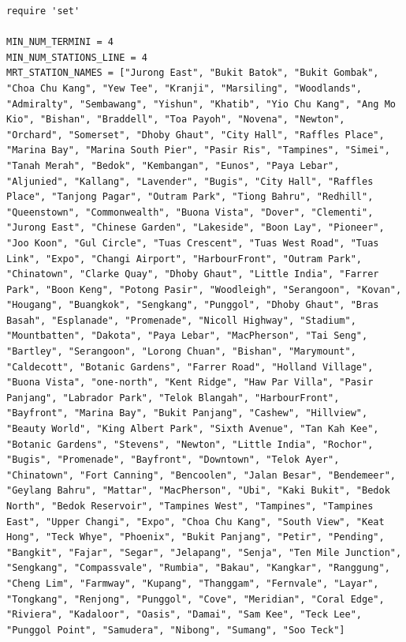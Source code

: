 \documentclass[a4paper,12pt]{article}
\begin{document}
	\begin{verbatim}
require 'set'

MIN_NUM_TERMINI = 4
MIN_NUM_STATIONS_LINE = 4
MRT_STATION_NAMES = ["Jurong East", "Bukit Batok", "Bukit Gombak", "Choa Chu Kang", "Yew Tee", "Kranji", "Marsiling", "Woodlands", "Admiralty", "Sembawang", "Yishun", "Khatib", "Yio Chu Kang", "Ang Mo Kio", "Bishan", "Braddell", "Toa Payoh", "Novena", "Newton", "Orchard", "Somerset", "Dhoby Ghaut", "City Hall", "Raffles Place", "Marina Bay", "Marina South Pier", "Pasir Ris", "Tampines", "Simei", "Tanah Merah", "Bedok", "Kembangan", "Eunos", "Paya Lebar", "Aljunied", "Kallang", "Lavender", "Bugis", "City Hall", "Raffles Place", "Tanjong Pagar", "Outram Park", "Tiong Bahru", "Redhill", "Queenstown", "Commonwealth", "Buona Vista", "Dover", "Clementi", "Jurong East", "Chinese Garden", "Lakeside", "Boon Lay", "Pioneer", "Joo Koon", "Gul Circle", "Tuas Crescent", "Tuas West Road", "Tuas Link", "Expo", "Changi Airport", "HarbourFront", "Outram Park", "Chinatown", "Clarke Quay", "Dhoby Ghaut", "Little India", "Farrer Park", "Boon Keng", "Potong Pasir", "Woodleigh", "Serangoon", "Kovan", "Hougang", "Buangkok", "Sengkang", "Punggol", "Dhoby Ghaut", "Bras Basah", "Esplanade", "Promenade", "Nicoll Highway", "Stadium", "Mountbatten", "Dakota", "Paya Lebar", "MacPherson", "Tai Seng", "Bartley", "Serangoon", "Lorong Chuan", "Bishan", "Marymount", "Caldecott", "Botanic Gardens", "Farrer Road", "Holland Village", "Buona Vista", "one-north", "Kent Ridge", "Haw Par Villa", "Pasir Panjang", "Labrador Park", "Telok Blangah", "HarbourFront", "Bayfront", "Marina Bay", "Bukit Panjang", "Cashew", "Hillview", "Beauty World", "King Albert Park", "Sixth Avenue", "Tan Kah Kee", "Botanic Gardens", "Stevens", "Newton", "Little India", "Rochor", "Bugis", "Promenade", "Bayfront", "Downtown", "Telok Ayer", "Chinatown", "Fort Canning", "Bencoolen", "Jalan Besar", "Bendemeer", "Geylang Bahru", "Mattar", "MacPherson", "Ubi", "Kaki Bukit", "Bedok North", "Bedok Reservoir", "Tampines West", "Tampines", "Tampines East", "Upper Changi", "Expo", "Choa Chu Kang", "South View", "Keat Hong", "Teck Whye", "Phoenix", "Bukit Panjang", "Petir", "Pending", "Bangkit", "Fajar", "Segar", "Jelapang", "Senja", "Ten Mile Junction", "Sengkang", "Compassvale", "Rumbia", "Bakau", "Kangkar", "Ranggung", "Cheng Lim", "Farmway", "Kupang", "Thanggam", "Fernvale", "Layar", "Tongkang", "Renjong", "Punggol", "Cove", "Meridian", "Coral Edge", "Riviera", "Kadaloor", "Oasis", "Damai", "Sam Kee", "Teck Lee", "Punggol Point", "Samudera", "Nibong", "Sumang", "Soo Teck"]


\end{verbatim}
\end{document}
